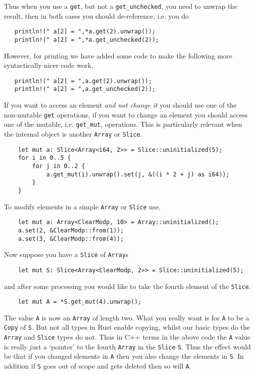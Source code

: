 Thus when you use a \verb|get|, but not a \verb|get_unchecked|, 
you need to unwrap the result, then in both cases you should de-reference,
i.e. you do
\begin{lstlisting}
   println!(" a[2] = ",*a.get(2).unwrap());
   println!(" a[2] = ",*a.get_unchecked(2));
\end{lstlisting}
However, for printing we have added some code to make the following more
syntactically nicer code work,
\begin{lstlisting}
   println!(" a[2] = ",a.get(2).unwrap());
   println!(" a[2] = ",a.get_unchecked(2));
\end{lstlisting}

If you want to access an element {\em and not change it} you should use
one of the non-mutable \verb|get| operations, if you want to change an
element you should access one of the mutable, i.e. \verb|get_mut|, operations.
This is particularly relevant when the internal object is another \verb|Array| or
\verb|Slice|.
\begin{lstlisting}
    let mut a: Slice<Array<i64, 2>> = Slice::uninitialized(5);
    for i in 0..5 {
        for j in 0..2 {
            a.get_mut(i).unwrap().set(j, &((i * 2 + j) as i64));
        }
    }
\end{lstlisting}
To modify elements in a simple \verb|Array| or \verb|Slice| use.
\begin{lstlisting}
    let mut a: Array<ClearModp, 10> = Array::uninitialized();
    a.set(2, &ClearModp::from(1));
    a.set(3, &ClearModp::from(4));
\end{lstlisting}
Now suppose you have a \verb|Slice| of \verb|Array|s
\begin{lstlisting}
    let mut S: Slice<Array<ClearModp, 2>> = Slice::uninitialized(5);
\end{lstlisting}
and after some processing you would like to take the fourth element of the
\verb|Slice|.
\begin{lstlisting}
    let mut A = *S.get_mut(4).unwrap();
\end{lstlisting}
The value \verb|A| is now an \verb|Array| of length two.
What you really want is for \verb|A| to be a \verb|Copy| of \verb|S|.
But not all types in Rust enable copying, whilst our basic types do
the \verb|Array| and \verb|Slice| types do not.
Thus in C++ terms in the above code the \verb|A| value is really just a `pointer' 
to the fourth \verb|Array| in the \verb|Slice| \verb|S|.
Thus the effect would be that if you changed elements in \verb|A| then you 
also change the elements in \verb|S|.
In addition if \verb|S| goes out of scope and gets deleted then so will \verb|A|.

